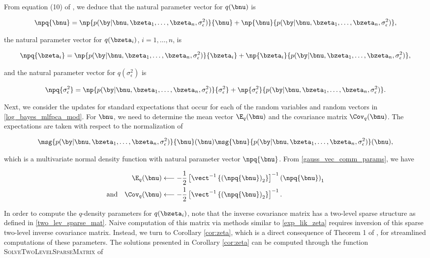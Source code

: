\documentclass[12pt]{article}
\theoremstyle{plain}
\theoremstyle{definition}
\theoremstyle{remark}
\def\sigsqeps{\sigma^2_{\epsilon}}
\begin{document}
From equation (10) of \citet{wand17}, we deduce that the natural parameter vector for $q (\bnu)$ is

\[
	\npq{\bnu} =
		\np{p (\by | \bnu, \bzeta_1, \dots, \bzeta_n, \sigsqeps)}{\bnu}
		+ \np{\bnu}{p (\by | \bnu, \bzeta_1, \dots, \bzeta_n, \sigsqeps)},
\]

\noindent the natural parameter vector for $q (\bzeta_i)$, $i = 1, \dots, n$, is

\[
	\npq{\bzeta_i} =
		\np{p (\by | \bnu, \bzeta_1, \dots, \bzeta_n, \sigsqeps)}{\bzeta_i}
		+ \np{\bzeta_i}{p (\by | \bnu, \bzeta_1, \dots, \bzeta_n, \sigsqeps)},
\]

\noindent and the natural parameter vector for $q(\sigsqeps)$ is

\[
	\npq{\sigsqeps} =
		\np{p (\by | \bnu, \bzeta_1, \dots, \bzeta_n, \sigsqeps)}{\sigsqeps}
		+ \np{\sigsqeps}{p (\by | \bnu, \bzeta_1, \dots, \bzeta_n, \sigsqeps)}.
\]

Next, we consider the updates for standard expectations that occur for each of
the random variables and random vectors in
\eqref{log_bayes_mlfpca_mod}. For $\bnu$, we need to determine the mean vector $\E_q (\bnu)$
and the covariance matrix $\Cov_q (\bnu)$. The expectations are taken with respect to the normalization
of

\[
	\msg{p (\by | \bnu, \bzeta_1, \dots, \bzeta_n, \sigsqeps)}{\bnu} (\bnu)
	\msg{\bnu}{p (\by | \bnu, \bzeta_1, \dots, \bzeta_n, \sigsqeps)} (\bnu),
\]

\noindent which is a multivariate normal density function with natural parameter vector $\npq{\bnu}$.
From \eqref{gauss_vec_comm_params}, we have

\begin{align}
\begin{split}
	\E_q (\bnu)
		&\longleftarrow
			-\frac12 \left[
				\vect^{-1} \left\{
					\left( \npq{\bnu} \right)_2
				\right\}
			\right]^{-1} \left( \npq{\bnu} \right)_1 \\
	\text{and} \quad
	\Cov_q (\bnu)
		&\longleftarrow
			-\frac12 \left[
				\vect^{-1} \left\{
					\left( \npq{\bnu} \right)_2
				\right\}
			\right]^{-1}.
\end{split}
\label{mom_ml_lik_nu}
\end{align}

In order to compute the $q$-density parameters for $q (\bzeta_i)$, note that the inverse covariance matrix has a
two-level sparse structure as defined in \eqref{two_lev_sparse_mat}. Naive computation of this matrix via methods
similar to \eqref{exp_lik_zeta} requires inversion of this sparse two-level inverse covariance matrix. Instead, we
turn to Corollary \ref{cor:zeta}, which is a direct consequence of Theorem 1 of \citet{nolan20}, for streamlined
computations of these parameters.
The solutions presented in Corollary \ref{cor:zeta} can be computed through the function
\textsc{SolveTwoLevelSparseMatrix} of \citet[Algorithm~A.1]{nolanmw20}
\end{document}
